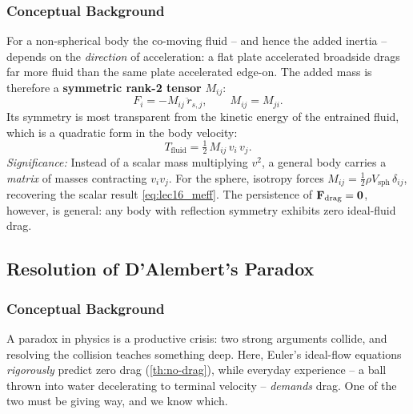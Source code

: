 \documentclass[../main.tex]{subfiles}
\begin{document}
\subsubsection*{Conceptual Background}
For a non-spherical body the co-moving fluid -- and hence the added inertia -- depends on the \emph{direction} of acceleration: a flat plate accelerated broadside drags far more fluid than the same plate accelerated edge-on. The added mass is therefore a \textbf{symmetric rank-2 tensor} $M_{ij}$:
\begin{equation}
  F_i = -M_{ij}\,\ddot r_{s,j},\qquad M_{ij}=M_{ji}.
  \label{eq:lec16_Mtensor}
\end{equation}
Its symmetry is most transparent from the kinetic energy of the entrained fluid, which is a quadratic form in the body velocity:
\begin{equation}
  \boxed{T_{\text{fluid}} = \tfrac{1}{2}\,M_{ij}\,v_i\,v_j.}
  \label{eq:lec16_Tfluid}
\end{equation}
\textit{Significance:} Instead of a scalar mass multiplying $v^2$, a general body carries a \emph{matrix} of masses contracting $v_iv_j$. For the sphere, isotropy forces $M_{ij}=\tfrac{1}{2}\rho V_{\text{sph}}\,\delta_{ij}$, recovering the scalar result \eqref{eq:lec16_meff}. The persistence of $\mathbf{F}_{\text{drag}}=\mathbf{0}$, however, is general: any body with reflection symmetry exhibits zero ideal-fluid drag.


\subsection{Resolution of D'Alembert's Paradox}\label{sec:lec16:resolution}

\subsubsection*{Conceptual Background}
A paradox in physics is a productive crisis: two strong arguments collide, and resolving the collision teaches something deep. Here, Euler's ideal-flow equations \emph{rigorously} predict zero drag (\cref{th:no-drag}), while everyday experience -- a ball thrown into water decelerating to terminal velocity -- \emph{demands} drag. One of the two must be giving way, and we know which.
\end{document}
